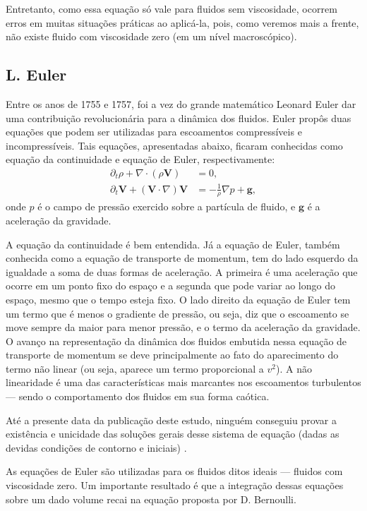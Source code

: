 Entretanto, como essa equação só vale para fluidos sem viscosidade, ocorrem erros em muitas situações práticas ao aplicá-la, pois, como veremos mais a frente, não existe fluido com viscosidade zero (em um nível macroscópico).
\subsection{L. Euler}
Entre os anos de 1755 e 1757, foi a vez do grande matemático Leonard Euler dar uma contribuição revolucionária para a dinâmica dos fluidos. Euler propôs duas equações que podem ser utilizadas para escoamentos compressíveis e incompressíveis. Tais equações, apresentadas abaixo, ficaram conhecidas como equação da continuidade e equação de Euler, respectivamente:
\begin{align*}
    \partial_t \rho + \nabla \cdot (\rho\textbf{V}) &= 0,\\
    \partial_t \textbf{V} + (\textbf{V}\cdot\nabla)\textbf{V} &=-\frac{1}{\rho} \nabla p + \textbf{g},
\end{align*}
onde $p$ é o campo de pressão exercido sobre a partícula de fluido, e $\textbf{g}$ é a aceleração da gravidade. 

A equação da continuidade é bem entendida. Já a equação de Euler, também conhecida como a equação de transporte de momentum, tem do lado esquerdo da igualdade a soma de duas formas de aceleração. A primeira é uma aceleração que ocorre em um ponto fixo do espaço e a segunda que pode variar ao longo do espaço, mesmo que o tempo esteja fixo. O lado direito da equação de Euler tem um termo que é menos o gradiente de pressão, ou seja, diz que o escoamento se move sempre da maior para menor pressão, e o termo da aceleração da gravidade. O avanço na representação da dinâmica dos fluidos embutida nessa equação de transporte de momentum se deve principalmente ao fato do aparecimento do termo não linear (ou seja, aparece um termo proporcional a $v^2$). A não linearidade é uma das características mais marcantes nos escoamentos turbulentos — sendo o comportamento dos fluidos em sua forma caótica. 

Até a presente data da publicação deste estudo, ninguém conseguiu provar a existência e unicidade das soluções gerais desse sistema de equação (dadas as devidas condições de contorno e iniciais) \cite{fefferman2000existence}.

As equações de Euler são utilizadas para os fluidos ditos ideais — fluidos com viscosidade zero. Um importante resultado é que a integração dessas equações sobre um dado volume recai na equação proposta por D. Bernoulli. 

